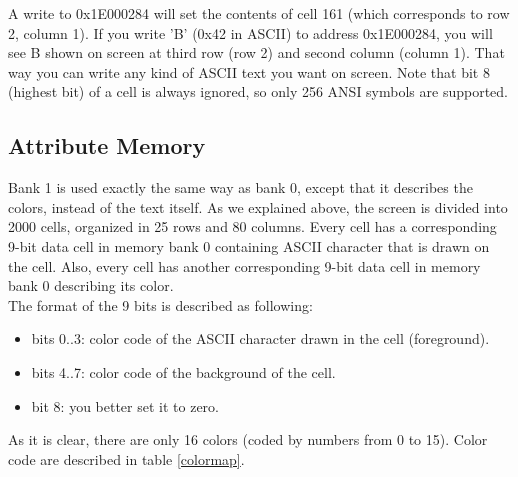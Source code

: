 \documentclass[oneside]{book}
\begin{document}
A write to 0x1E000284 will set the contents of cell 161 (which corresponds to
row 2, column 1). If you write 'B' (0x42 in ASCII) to address 0x1E000284, you
will see B shown on screen at third row (row 2) and second column (column 1).
That way you can write any kind of ASCII text you want on screen. Note that
bit 8 (highest bit) of a cell is always ignored, so only 256 ANSI symbols
are supported.

\subsection{Attribute Memory}

Bank 1 is used exactly the same way as bank 0, except that it describes
the colors, instead of the text itself. As we explained above, the screen
is divided into 2000 cells, organized in 25 rows and 80 columns. Every
cell has a corresponding 9-bit data cell in memory bank 0 containing ASCII
character that is drawn on the cell. Also, every cell has another 
corresponding 9-bit data cell in memory bank 0 describing its color.\\

The format of the 9 bits is described as following:

\begin{itemize}

\item bits 0..3: color code of the ASCII character drawn in the cell 
                 (foreground).
\item bits 4..7: color code of the background of the cell.
\item bit 8: you better set it to zero.

\end{itemize}

As it is clear, there are only 16 colors (coded by numbers from 0 to 15). 
Color code are described in table \ref{colormap}.
\end{document}
